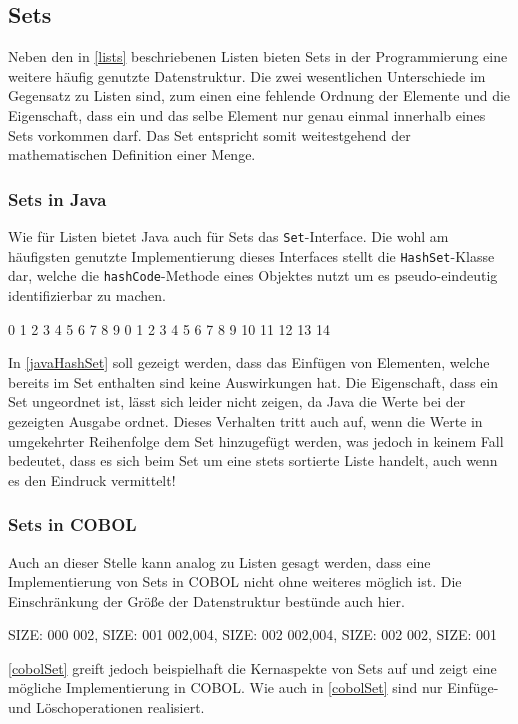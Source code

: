 \subsection{Sets}
Neben den in \autoref{lists} beschriebenen Listen bieten Sets in der Programmierung eine weitere häufig genutzte Datenstruktur. Die zwei wesentlichen Unterschiede im Gegensatz zu Listen sind, zum einen eine fehlende Ordnung der Elemente und die Eigenschaft, dass ein und das selbe Element nur genau einmal innerhalb eines Sets vorkommen darf. Das Set entspricht somit weitestgehend der mathematischen Definition einer Menge.

\subsubsection*{Sets in Java}
Wie für Listen bietet Java auch für Sets das \texttt{Set}-Interface. Die wohl am häufigsten genutzte Implementierung dieses Interfaces stellt die \texttt{HashSet}-Klasse dar, welche die \texttt{hashCode}-Methode eines Objektes nutzt um es pseudo-eindeutig identifizierbar zu machen.

\begin{shellwindow}
0 1 2 3 4 5 6 7 8 9 
0 1 2 3 4 5 6 7 8 9 10 11 12 13 14 
\end{shellwindow}
In \autoref{javaHashSet} soll gezeigt werden, dass das Einfügen von Elementen, welche bereits im Set enthalten sind keine Auswirkungen hat. Die Eigenschaft, dass ein Set ungeordnet ist, lässt sich leider nicht zeigen, da Java die Werte bei der gezeigten Ausgabe ordnet. Dieses Verhalten tritt auch auf, wenn die Werte in umgekehrter Reihenfolge dem Set hinzugefügt werden, was jedoch in keinem Fall bedeutet, dass es sich beim Set um eine stets sortierte Liste handelt, auch wenn es den Eindruck vermittelt!

\subsubsection*{Sets in COBOL}
Auch an dieser Stelle kann analog zu Listen gesagt werden, dass eine Implementierung von Sets in COBOL nicht ohne weiteres möglich ist. Die Einschränkung der Größe der Datenstruktur bestünde auch hier. 
\begin{shellwindow}
 SIZE: 000
002, SIZE: 001
002,004, SIZE: 002
002,004, SIZE: 002
002, SIZE: 001
\end{shellwindow}
\autoref{cobolSet} greift jedoch beispielhaft die Kernaspekte von Sets auf und zeigt eine mögliche Implementierung in COBOL. Wie auch in \autoref{cobolSet} sind nur Einfüge- und Löschoperationen realisiert.